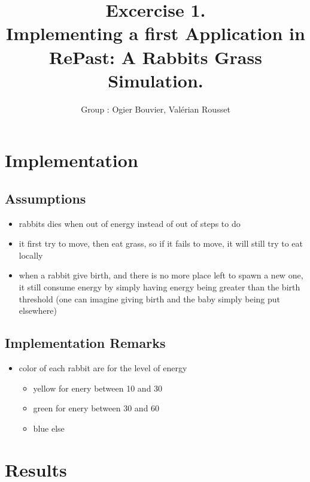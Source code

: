 \documentclass[11pt]{article}
\title{\bf Excercise 1.\\ Implementing a first Application in RePast: A Rabbits Grass Simulation.}
\author{Group \textnumero 17: Ogier Bouvier, Val\'erian Rousset}
\begin{document}
\maketitle

\section{Implementation}

\subsection{Assumptions}

\begin{itemize}
	\item rabbits dies when out of energy instead of out of steps to do
	\item it first try to move, then eat grass, so if it fails to move, it
		will still try to eat locally
	\item when a rabbit give birth, and there is no more place left to spawn
		a new one, it still consume energy by simply having energy being
		greater than the birth threshold (one can imagine giving birth
		and the baby simply being put elsewhere)
\end{itemize}

\subsection{Implementation Remarks}

\begin{itemize}
	\item color of each rabbit are for the level of energy
	\begin{itemize}
		\item yellow for enery between 10 and 30
		\item green for enery between 30 and 60
		\item blue else
	\end{itemize}
\end{itemize}

\section{Results}
\end{document}
